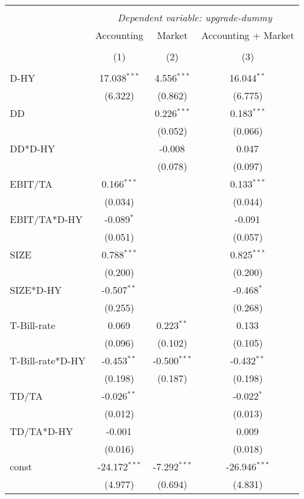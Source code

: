\begin{table}[!htbp] \centering
\begin{tabular}{@{\extracolsep{5pt}}lccc}
\\[-1.8ex]\hline
\hline \\[-1.8ex]
& \multicolumn{3}{c}{\textit{Dependent variable: upgrade-dummy}} \
\cr \cline{2-4}
\\[-1.8ex] & \multicolumn{1}{c}{Accounting} & \multicolumn{1}{c}{Market} & \multicolumn{1}{c}{Accounting + Market}  \\
\\[-1.8ex] & (1) & (2) & (3) \\
\hline \\[-1.8ex]
 D-HY & 17.038$^{***}$ & 4.556$^{***}$ & 16.044$^{**}$ \\
& (6.322) & (0.862) & (6.775) \\
 DD & & 0.226$^{***}$ & 0.183$^{***}$ \\
& & (0.052) & (0.066) \\
 DD*D-HY & & -0.008$^{}$ & 0.047$^{}$ \\
& & (0.078) & (0.097) \\
 EBIT/TA & 0.166$^{***}$ & & 0.133$^{***}$ \\
& (0.034) & & (0.044) \\
 EBIT/TA*D-HY & -0.089$^{*}$ & & -0.091$^{}$ \\
& (0.051) & & (0.057) \\
 SIZE & 0.788$^{***}$ & & 0.825$^{***}$ \\
& (0.200) & & (0.200) \\
 SIZE*D-HY & -0.507$^{**}$ & & -0.468$^{*}$ \\
& (0.255) & & (0.268) \\
 T-Bill-rate & 0.069$^{}$ & 0.223$^{**}$ & 0.133$^{}$ \\
& (0.096) & (0.102) & (0.105) \\
 T-Bill-rate*D-HY & -0.453$^{**}$ & -0.500$^{***}$ & -0.432$^{**}$ \\
& (0.198) & (0.187) & (0.198) \\
 TD/TA & -0.026$^{**}$ & & -0.022$^{*}$ \\
& (0.012) & & (0.013) \\
 TD/TA*D-HY & -0.001$^{}$ & & 0.009$^{}$ \\
& (0.016) & & (0.018) \\
 const & -24.172$^{***}$ & -7.292$^{***}$ & -26.946$^{***}$ \\
& (4.977) & (0.694) & (4.831) \\

\end{tabular}
\end{table}
